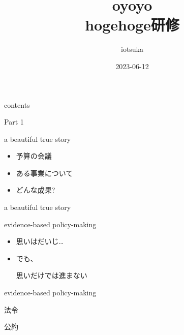 \documentclass[
  ignorenonframetext,
]{beamer}
\title{oyoyo\\
hogehoge研修}
\author{iotsuka}
\date{2023-06-12}
\institute{piyopiyo}
\begin{document}
\frame{\titlepage}

\begin{frame}{contents}
\protect\hypertarget{contents}{}
\Huge

\end{frame}

\begin{frame}{Part 1}
\protect\hypertarget{part-1}{}
\Huge

\scalebox{2}{\textcolor{lightpurple}{データ}}
\end{frame}

\begin{frame}{a beautiful true story}
\protect\hypertarget{a-beautiful-true-story}{}
\Huge

\begin{itemize}
\item[\textbullet] 予算の会議
\item[\textbullet] ある事業について
\item[\textbullet] どんな成果?
\end{itemize}
\end{frame}

\begin{frame}{a beautiful true story}
\protect\hypertarget{a-beautiful-true-story-1}{}
\end{frame}

\begin{frame}{evidence-based policy-making}
\protect\hypertarget{evidence-based-policy-making}{}
\Huge

\begin{itemize}
\item 思いはだいじ\ldots\pause
\item でも、\par
思いだけでは進まない
\end{itemize}
\pause
\vspace*{-22pt}
\hspace*{18pt}
\end{frame}

\begin{frame}{evidence-based policy-making}
\protect\hypertarget{evidence-based-policy-making-1}{}
\Huge

法令\pause

公約\pause

\scalebox{1.732}{\textcolor{red!40}{データ}}
\end{frame}
\end{document}
